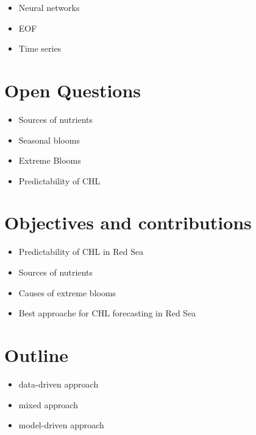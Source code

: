 			\begin{itemize}
				\item Neural networks
				\item EOF
				\item Time series
			\end{itemize}

\section{Open Questions}
\label{intro:questions}

	\begin{itemize}
		\item Sources of nutrients
		\item Seasonal blooms
		\item Extreme Blooms
		\item Predictability of CHL
	\end{itemize}

\section{Objectives and contributions}
\label{intro:objectives}

	\begin{itemize}
		\item Predictability of CHL in Red Sea
		\item Sources of nutrients
		\item Causes of extreme blooms
		\item Best approache for CHL forecasting in Red Sea
	\end{itemize}

\section{Outline}
\label{intro:outline}

	\begin{itemize}
		\item data-driven approach
		\item mixed approach
		\item model-driven approach
	\end{itemize}

